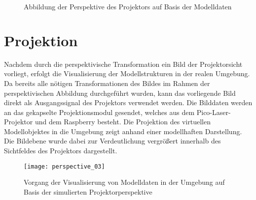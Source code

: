 \begin{figure}[!ht]
	\begin{center}
	\hspace{5mm}
	\caption{Abbildung der Perspektive des Projektors auf Basis der Modelldaten}
	\label{fig.projpersp_gui}
	\end{center}
\end{figure}%
%
%
%
%
\section{Projektion}
\label{chap.projection}
Nachdem durch die perspektivische Transformation ein Bild der Projektorsicht vorliegt, erfolgt die Visualisierung der Modellstrukturen in der realen Umgebung. Da bereits alle nötigen Transformationen des Bildes im Rahmen der perspektivischen Abbildung durchgeführt wurden, kann das vorliegende Bild direkt als Ausgangssignal des Projektors verwendet werden. Die Bilddaten werden an das gekapselte Projektionsmodul gesendet, welches aus dem Pico-Laser-Projektor und dem Raspberry besteht. Die Projektion des virtuellen Modellobjektes in die Umgebung zeigt  anhand einer modellhaften Darstellung. 
Die Bildebene wurde dabei zur Verdeutlichung vergrößert innerhalb des Sichtfeldes des Projektors dargestellt. 

\clearpage{}

\begin{figure}[!ht]
	\begin{center}
		\texttt{[image: perspective\_03]}
		\caption{Vorgang der Visualisierung von Modelldaten in der Umgebung auf Basis der simulierten Projektorperspektive}
		\label{fig.perspproj}
	\end{center}
\end{figure}


